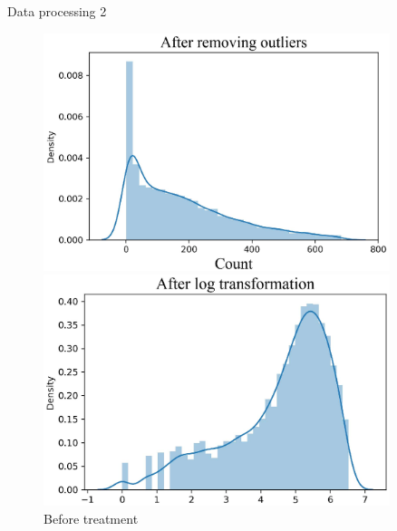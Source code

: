 \documentclass[
  size=14pt,
  paper=smartboard,  %
  mode=present, 		%
  display=slides, 	%
  style=tuliplab,  	%
  pauseslide,
  fleqn,leqno]{powerdot}
\begin{document}
      \begin{slide}{Data processing 2}
        \begin{figure}[htbp]
          \centering
          \begin{minipage}[t]{0.48\textwidth}
          \centering
          \includegraphics[width=0.9\textwidth]{figures//1_after.eps}
          \vspace{-1.4em}
          \caption{Before treatment}
          \end{minipage}
          \begin{minipage}[t]{0.48\textwidth}
          \centering
          \includegraphics[width=0.9\textwidth]{figures//log.eps}

\end{minipage}
\end{figure}
\end{slide}
\end{document}
